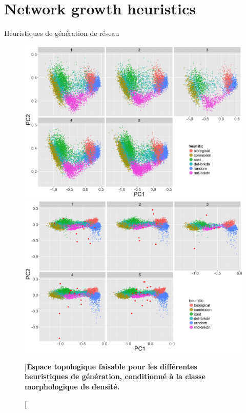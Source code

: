 







\newpage

\section{Network growth heuristics}{Heuristiques de génération de réseau}

\label{app:sec:networkgrowth}




\begin{figure}
\includegraphics[width=\linewidth]{Figures/NetworkGrowth/feasible_space_pca_bymorph}
\includegraphics[width=\linewidth]{Figures/NetworkGrowth/feasible_space_withreal_pca_bymorph}
\caption[][]{}{\textbf{Espace topologique faisable pour les différentes heuristiques de génération, conditionné à la classe morphologique de densité.}}
\end{figure}






